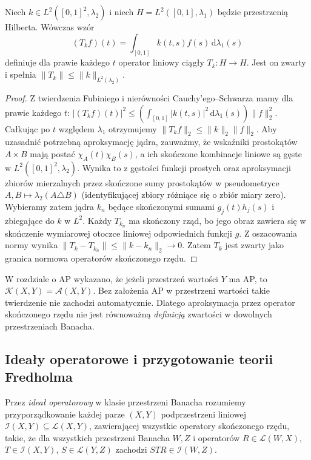 \begin{twierdzenie}
\label{thm:hilbert-schmidt29}
Niech $k\in L^2([0,1]^2,\lambda_2)$ i niech
$H=L^2([0,1],\lambda_1)$ będzie przestrzenią Hilberta.
Wówczas wzór
\[
(T_kf)(t)=\int_{[0,1]}k(t,s)f(s)\,\mathrm d\lambda_1(s)
\]
definiuje dla prawie każdego $t$ operator liniowy ciągły
$T_k:H\to H$. Jest on zwarty i spełnia
$\|T_k\|\le\|k\|_{L^2(\lambda_2)}$.
\end{twierdzenie}
\begin{proof}
Z twierdzenia Fubiniego i nierówności Cauchy'ego--Schwarza
mamy dla prawie każdego $t$:
$|(T_kf)(t)|^2\le
(\int_{[0,1]}|k(t,s)|^2\,\mathrm d\lambda_1(s))\|f\|_2^2$.
Całkując po $t$ względem $\lambda_1$ otrzymujemy
$\|T_kf\|_2\le\|k\|_2\|f\|_2$.
Aby uzasadnić potrzebną aproksymację jądra, zauważmy, że
wskaźniki prostokątów $A\times B$ mają postać
$\chi_A(t)\chi_B(s)$, a ich skończone kombinacje
liniowe są gęste w $L^2([0,1]^2,\lambda_2)$.
Wynika to z gęstości funkcji prostych oraz aproksymacji
zbiorów mierzalnych przez skończone sumy prostokątów
w pseudometryce $A,B\mapsto\lambda_2(A\triangle B)$
(identyfikującej zbiory różniące się o zbiór miary zero).
Wybieramy zatem jądra $k_n$ będące skończonymi sumami
$g_j(t)h_j(s)$ i zbiegające do $k$ w $L^2$.
Każdy $T_{k_n}$ ma skończony rząd, bo jego obraz zawiera się
w skończenie wymiarowej otoczce liniowej odpowiednich
funkcji $g$. Z oszacowania normy wynika
$\|T_k-T_{k_n}\|\le\|k-k_n\|_2\to0$.
Zatem $T_k$ jest zwarty jako granica normowa operatorów
skończonego rzędu.
\end{proof}

\begin{uwaga}
\label{rem:nonapproximable29}
W rozdziale o AP wykazano, że jeżeli przestrzeń wartości
$Y$ ma AP, to $\mathcal K(X,Y)=\mathcal A(X,Y)$.
Bez założenia AP w przestrzeni wartości takie twierdzenie
nie zachodzi automatycznie. Dlatego aproksymacja przez
operator skończonego rzędu nie jest równoważną
\emph{definicją} zwartości w dowolnych przestrzeniach Banacha.
\end{uwaga}

\subsection{Ideały operatorowe i przygotowanie teorii Fredholma}

\begin{definicja}
\label{def:operator-ideal29}
Przez \emph{ideał operatorowy} w klasie przestrzeni Banacha
rozumiemy przyporządkowanie każdej parze $(X,Y)$
podprzestrzeni liniowej $\mathcal I(X,Y)\subseteq\mathcal L(X,Y)$,
zawierającej wszystkie operatory skończonego rzędu,
takie, że dla wszystkich przestrzeni Banacha $W,Z$
i operatorów $R\in\mathcal L(W,X)$, $T\in\mathcal I(X,Y)$,
$S\in\mathcal L(Y,Z)$ zachodzi
$STR\in\mathcal I(W,Z)$.
\end{definicja}

